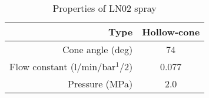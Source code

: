 \begin{table}
\begin{center}
\begin{tabular}{r|c}
\hline
Type                               &  Hollow-cone \\ \hline
Cone angle (deg)                   & 74           \\ \hline
Flow constant  (l/min/bar$^1/2$)   & 0.077             \\ \hline
Pressure (MPa)   &  2.0         \\ \hline
\end{tabular}
\caption{Properties of LN02 spray}
\end{center}
\end{table}

